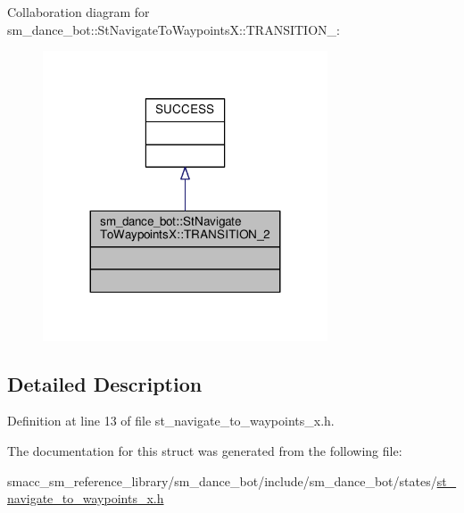 Collaboration diagram for sm\+\_\+dance\+\_\+bot\+:\+:St\+Navigate\+To\+WaypointsX\+:\+:T\+R\+A\+N\+S\+I\+T\+I\+O\+N\+\_\+:\nopagebreak
\begin{figure}[H]
\begin{center}
\leavevmode
\includegraphics[width=239pt]{structsm__dance__bot_1_1StNavigateToWaypointsX_1_1TRANSITION__2__coll__graph}
\end{center}
\end{figure}


\subsection{Detailed Description}


Definition at line 13 of file st\+\_\+navigate\+\_\+to\+\_\+waypoints\+\_\+x.\+h.



The documentation for this struct was generated from the following file\+:\begin{DoxyCompactItemize}
\item 
smacc\+\_\+sm\+\_\+reference\+\_\+library/sm\+\_\+dance\+\_\+bot/include/sm\+\_\+dance\+\_\+bot/states/\hyperlink{include_2sm__dance__bot_2states_2st__navigate__to__waypoints__x_8h}{st\+\_\+navigate\+\_\+to\+\_\+waypoints\+\_\+x.\+h}\end{DoxyCompactItemize}
